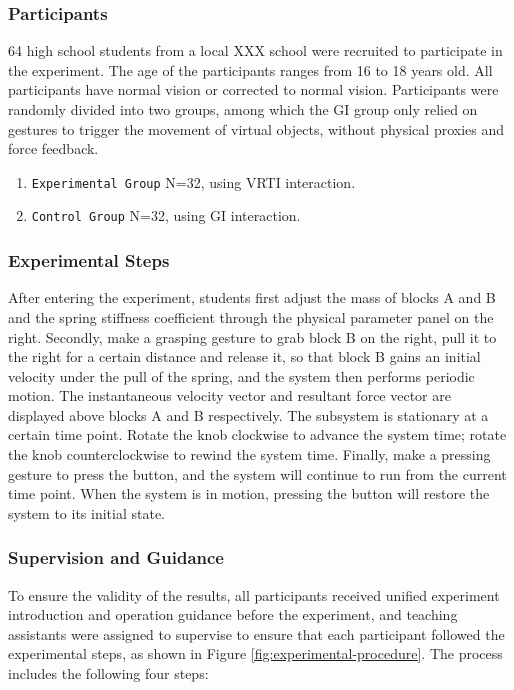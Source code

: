 \documentclass[runningheads]{llncs}
\begin{document}
\subsubsection{Participants}
64 high school students from a local XXX school were recruited to participate in the experiment. The age of the participants ranges from 16 to 18 years old. All participants have normal vision or corrected to normal vision. Participants were randomly divided into two groups, among which the GI group only relied on gestures to trigger the movement of virtual objects, without physical proxies and force feedback.

\begin{enumerate}[label={\arabic*)}]
  \item \texttt{Experimental Group} N=32, using VRTI interaction.
  \item \texttt{Control Group} N=32, using GI interaction.
\end{enumerate}

\subsubsection{Experimental Steps}
After entering the experiment, students first adjust the mass of blocks A and B and the spring stiffness coefficient through the physical parameter panel on the right. Secondly, make a grasping gesture to grab block B on the right, pull it to the right for a certain distance and release it, so that block B gains an initial velocity under the pull of the spring, and the system then performs periodic motion. The instantaneous velocity vector and resultant force vector are displayed above blocks A and B respectively. The subsystem is stationary at a certain time point. Rotate the knob clockwise to advance the system time; rotate the knob counterclockwise to rewind the system time. Finally, make a pressing gesture to press the button, and the system will continue to run from the current time point. When the system is in motion, pressing the button will restore the system to its initial state.

\subsubsection{Supervision and Guidance}
To ensure the validity of the results, all participants received unified experiment introduction and operation guidance before the experiment, and teaching assistants were assigned to supervise to ensure that each participant followed the experimental steps, as shown in Figure \ref{fig:experimental-procedure}. The process includes the following four steps:
\end{document}
